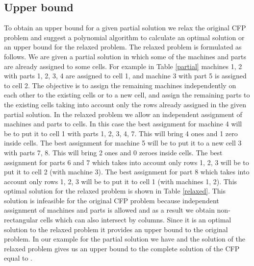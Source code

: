 \documentclass[citeauthoryear]{llncs}
\begin{document}
\subsection{Upper bound}
To obtain an upper bound for a given partial solution we relax the original CFP problem and suggest a polynomial algorithm to calculate an optimal solution or an upper bound for the relaxed problem.
The relaxed problem is formulated as follows.
We are given a partial solution in which some of the machines and parts are already assigned to some cells.
For example in Table \ref{partial} machines 1, 2 with parts 1, 2, 3, 4 are assigned to cell 1, and machine 3 with part 5 is assigned to cell 2.
The objective is to assign the remaining machines independently on each other to the existing cells or to a new cell, and assign the remaining parts to the existing cells taking into account only the rows already assigned in the given partial solution.
In the relaxed problem we allow an independent assignment of machines and parts to cells.
In this case the best assignment for machine 4 will be to put it to cell 1 with parts 1, 2, 3, 4, 7.
This will bring 4 ones and 1 zero inside cells.
The best assignment for machine 5 will be to put it to a new cell 3 with parts 7, 8.
This will bring 2 ones and 0 zeroes inside cells.
The best assignment for parts 6 and 7 which takes into account only rows 1, 2, 3 will be to put it to cell 2 (with machine 3).
The best assignment for part 8 which takes into account only rows 1, 2, 3 will be to put it to cell 1 (with machines 1, 2).
This optimal solution for the relaxed problem is shown in Table \ref{relaxed}.
This solution is infeasible for the original CFP problem because independent assignment of machines and parts is allowed and as a result we obtain non-rectangular cells which can also intersect by columns.
Since it is an optimal solution to the relaxed problem it provides an upper bound to the original problem.
In our example for the partial solution we have  and the solution of the relaxed problem gives us an upper bound to the complete solution of the CFP equal to .
\end{document}
